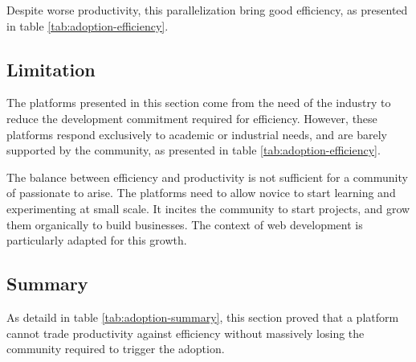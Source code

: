 Despite worse productivity, this parallelization bring good efficiency, as presented in table \ref{tab:adoption-efficiency}.


\subsection{Limitation}

The platforms presented in this section come from the need of the industry to reduce the development commitment required for efficiency.
However, these platforms respond exclusively to academic or industrial needs, and are barely supported by the community, as presented in table \ref{tab:adoption-efficiency}.

The balance between efficiency and productivity is not sufficient for a community of passionate to arise.
The platforms need to allow novice to start learning and experimenting at small scale.
It incites the community to start projects, and grow them organically to build businesses.
The context of web development is particularly adapted for this growth.


\subsection{Summary}

As detaild in table \ref{tab:adoption-summary}, this section proved that a platform cannot trade productivity against efficiency without massively losing the community required to trigger the adoption.












\endinput
